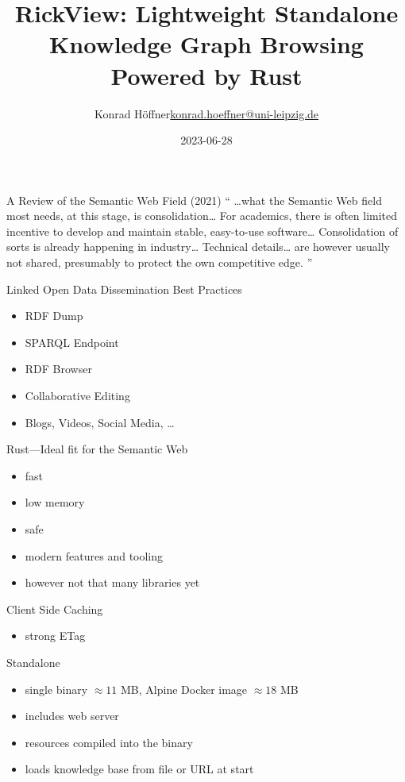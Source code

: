 \documentclass[14pt,aspectratio=1610]{beamer}
\date{2023-06-28}
\author{\texorpdfstring{Konrad Höffner\newline\url{konrad.hoeffner@uni-leipzig.de}}{Konrad Höffner}}
\title{RickView: Lightweight Standalone Knowledge Graph Browsing Powered by Rust}
\subtitle{}
\begin{document}
\begin{frame}
\titlepage
\end{frame}

\begin{frame}{A Review of the Semantic Web Field (2021)}
\enquote{
\ldots{}what the Semantic Web field most needs, at this stage, is consolidation\ldots
For academics, there is often limited incentive to develop and maintain stable, easy-to-use software\ldots
Consolidation of sorts is already happening in industry\ldots
Technical details\ldots{} are however usually not shared, presumably to protect the own competitive edge.
}
\end{frame}

\begin{frame}{Linked Open Data Dissemination Best Practices}
\begin{itemize}
\item RDF Dump
\item SPARQL Endpoint
\item RDF Browser
\pause
\item Collaborative Editing
\item Blogs, Videos, Social Media, \ldots
\end{itemize}
\end{frame}

\begin{frame}{Rust---Ideal fit for the Semantic Web}
\begin{itemize}
\item fast
\item low memory
\item safe
\item modern features and tooling
\pause
\item however not that many libraries yet
\end{itemize}
\end{frame}

\begin{frame}{Client Side Caching}
\begin{itemize}
\item strong ETag
\end{itemize}
\end{frame}

\begin{frame}{Standalone}
\begin{itemize}
\item single binary $\approx 11$ MB, Alpine Docker image $\approx 18$ MB
\item includes web server
\item resources compiled into the binary
\item loads knowledge base from file or URL at start
\end{itemize}
\end{frame}
\end{document}

